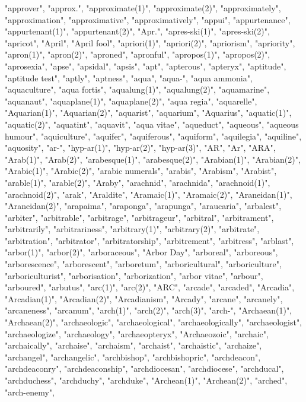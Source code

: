 "approver",
"approx.",
"approximate(1)",
"approximate(2)",
"approximately",
"approximation",
"approximative",
"approximatively",
"appui",
"appurtenance",
"appurtenant(1)",
"appurtenant(2)",
"Apr.",
"apres-ski(1)",
"apres-ski(2)",
"apricot",
"April",
"April fool",
"apriori(1)",
"apriori(2)",
"apriorism",
"apriority",
"apron(1)",
"apron(2)",
"aproned",
"apronful",
"apropos(1)",
"apropos(2)",
"aprosexia",
"apse",
"apsidal",
"apsis",
"apt",
"apterous",
"apteryx",
"aptitude",
"aptitude test",
"aptly",
"aptness",
"aqua",
"aqua-",
"aqua ammonia",
"aquaculture",
"aqua fortis",
"aqualung(1)",
"aqualung(2)",
"aquamarine",
"aquanaut",
"aquaplane(1)",
"aquaplane(2)",
"aqua regia",
"aquarelle",
"Aquarian(1)",
"Aquarian(2)",
"aquarist",
"aquarium",
"Aquarius",
"aquatic(1)",
"aquatic(2)",
"aquatint",
"aquavit",
"aqua vitae",
"aqueduct",
"aqueous",
"aqueous humour",
"aquiculture",
"aquifer",
"aquiferous",
"aquiform",
"aquilegia",
"aquiline",
"aquosity",
"ar-",
"hyp-ar(1)",
"hyp-ar(2)",
"hyp-ar(3)",
"AR",
"Ar",
"ARA",
"Arab(1)",
"Arab(2)",
"arabesque(1)",
"arabesque(2)",
"Arabian(1)",
"Arabian(2)",
"Arabic(1)",
"Arabic(2)",
"arabic numerals",
"arabis",
"Arabism",
"Arabist",
"arable(1)",
"arable(2)",
"Araby",
"arachnid",
"arachnida",
"arachnoid(1)",
"arachnoid(2)",
"arak",
"Araldite",
"Aramaic(1)",
"Aramaic(2)",
"Araneidan(1)",
"Araneidan(2)",
"arapaima",
"araponga",
"arapunga",
"araucaria",
"arbalest",
"arbiter",
"arbitrable",
"arbitrage",
"arbitrageur",
"arbitral",
"arbitrament",
"arbitrarily",
"arbitrariness",
"arbitrary(1)",
"arbitrary(2)",
"arbitrate",
"arbitration",
"arbitrator",
"arbitratorship",
"arbitrement",
"arbitress",
"arblast",
"arbor(1)",
"arbor(2)",
"arboraceous",
"Arbor Day",
"arboreal",
"arboreous",
"arborescence",
"arborescent",
"arboretum",
"arboricultural",
"arboriculture",
"arboriculturist",
"arborisation",
"arborization",
"arbor vitae",
"arbour",
"arboured",
"arbutus",
"arc(1)",
"arc(2)",
"ARC",
"arcade",
"arcaded",
"Arcadia",
"Arcadian(1)",
"Arcadian(2)",
"Arcadianism",
"Arcady",
"arcane",
"arcanely",
"arcaneness",
"arcanum",
"arch(1)",
"arch(2)",
"arch(3)",
"arch-",
"Archaean(1)",
"Archaean(2)",
"archaeologic",
"archaeological",
"archaeologically",
"archaeologist",
"archaeologize",
"archaeology",
"archaeopteryx",
"Archaeozoic",
"archaic",
"archaically",
"archaise",
"archaism",
"archaist",
"archaistic",
"archaize",
"archangel",
"archangelic",
"archbishop",
"archbishopric",
"archdeacon",
"archdeaconry",
"archdeaconship",
"archdiocesan",
"archdiocese",
"archducal",
"archduchess",
"archduchy",
"archduke",
"Archean(1)",
"Archean(2)",
"arched",
"arch-enemy",
